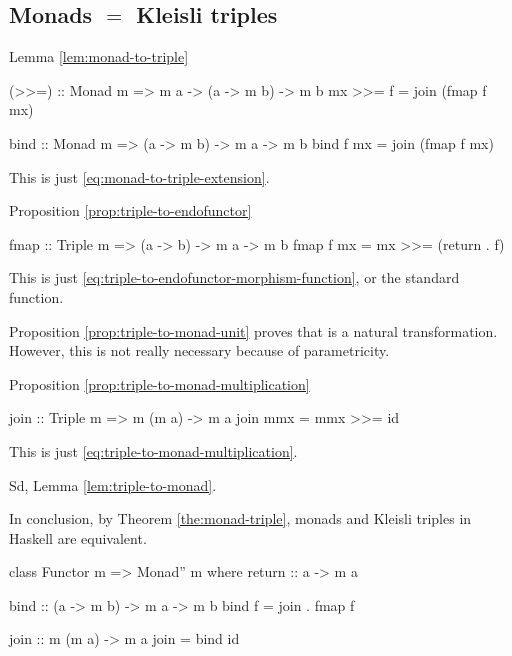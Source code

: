 \subsection*{Monads $=$ Kleisli triples}

Lemma \ref{lem:monad-to-triple}

\begin{codehaskell}
(>>=) :: Monad m => m a -> (a -> m b) -> m b
mx >>= f = join (fmap f mx)
\end{codehaskell}

\begin{codehaskell}
bind :: Monad m => (a -> m b) -> m a -> m b
bind f mx = join (fmap f mx)
\end{codehaskell}
This is just \eqref{eq:monad-to-triple-extension}.

Proposition \ref{prop:triple-to-endofunctor}
\begin{codehaskell}
fmap :: Triple m => (a -> b) -> m a -> m b
fmap f mx = mx >>= (return . f)
\end{codehaskell}
This is just \eqref{eq:triple-to-endofunctor-morphism-function}, or
the standard  function.

Proposition \ref{prop:triple-to-monad-unit} proves that
 is a natural transformation. However, this is not
really necessary because of parametricity.

Proposition \ref{prop:triple-to-monad-multiplication}
\begin{codehaskell}
join :: Triple m => m (m a) -> m a
join mmx = mmx >>= id
\end{codehaskell}
This is just \eqref{eq:triple-to-monad-multiplication}.

Sd, Lemma \ref{lem:triple-to-monad}.

In conclusion, by Theorem \ref{the:monad-triple}, monads and Kleisli triples
in Haskell are equivalent.

\begin{codehaskell}
class Functor m => Monad'' m where
  return :: a -> m a

  bind :: (a -> m b) -> m a -> m b
  bind f = join . fmap f

  join :: m (m a) -> m a
  join = bind id
\end{codehaskell}


